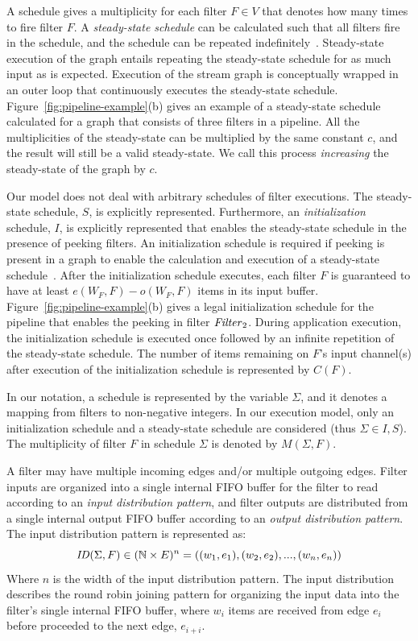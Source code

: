 A schedule gives a multiplicity for each filter $F \in V$ that denotes
how many times to fire filter $F$. A {\it steady-state schedule} can
be calculated such that all filters fire in the schedule, and the
schedule can be repeated indefinitely~\cite{lee87}.  Steady-state
execution of the graph entails repeating the steady-state schedule for
as much input as is expected.  Execution of the stream graph is
conceptually wrapped in an outer loop that continuously executes the
steady-state schedule.  Figure~\ref{fig:pipeline-example}(b) gives an
example of a steady-state schedule calculated for a graph that
consists of three filters in a pipeline.  All the multiplicities of
the steady-state can be multiplied by the same constant $c$, and the
result will still be a valid steady-state.  We call this process {\it
  increasing} the steady-state of the graph by $c$.

Our model does not deal with arbitrary schedules of filter executions.
The steady-state schedule, $S$, is explicitly represented.
Furthermore, an {\it initialization} schedule, $I$, is explicitly
represented that enables the steady-state schedule in the presence of
peeking filters.  An initialization schedule is required if peeking is
present in a graph to enable the calculation and execution of a
steady-state schedule~\cite{karczma-thesis}.  After the initialization
schedule executes, each filter $F$ is guaranteed to have at least
$e(W_F, F) - o(W_F, F)$ items in its input buffer.
Figure~\ref{fig:pipeline-example}(b) gives a legal initialization
schedule for the pipeline that enables the peeking in filter
$\relax{\it Filter}_2$.  During application execution, the initialization
schedule is executed once followed by an infinite repetition of the
steady-state schedule.  The number of items remaining on $F$'s input
channel(s) after execution of the initialization schedule is
represented by $C(F)$.

In our notation, a schedule is represented by the variable $\Sigma$,
and it denotes a mapping from filters to non-negative integers. In our
execution model, only an initialization schedule and a steady-state
schedule are considered (thus $\Sigma \in I,S$). The
multiplicity of filter $F$ in schedule $\Sigma$ is denoted by
$M(\Sigma, F)$.  

A filter may have multiple incoming edges and/or multiple outgoing
edges.  Filter inputs are organized into a single internal FIFO buffer for the
filter to read according to an {\it input distribution pattern}, and
filter outputs are distributed from a single internal output FIFO
buffer according to an {\it output distribution pattern}.   
The input distribution pattern is represented as:
{\ninepoint
\[ \relax{\it ID}(\Sigma, F) \in (\mathbb{N} \times E)^n = ((w_1,e_1), (w_2,
e_2), ..., (w_n, e_n))\]
}
\noindent Where $n$ is the width of the input distribution pattern.
The input distribution describes the round robin joining pattern for
organizing the input data into the filter's single internal FIFO
buffer, where $w_i$ items are received from edge $e_i$ before
proceeded to the next edge, $e_{i+i}$.

